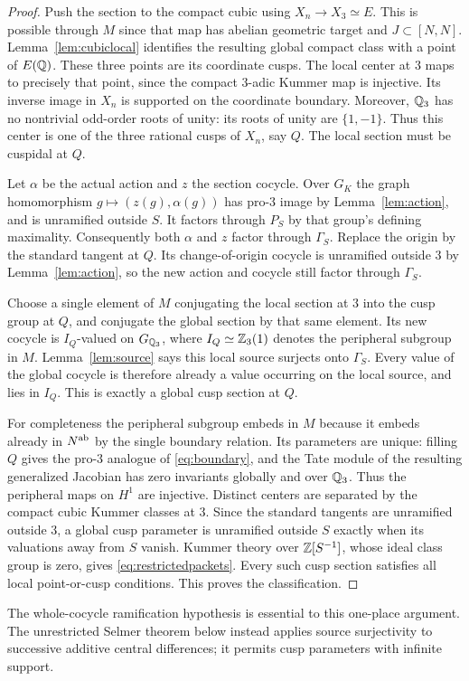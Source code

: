 \begin{proof}
Push the section to the compact cubic using $X_n\to X_3\simeq E$.
This is possible through $M$ since that map has abelian geometric
target and $J\subset[N,N]$. Lemma~\ref{lem:cubiclocal} identifies
the resulting global compact class with a point of $E(\mathbb Q)$.
These three points are its coordinate cusps. The local center at
$3$ maps to precisely that point, since the compact $3$-adic
Kummer map is injective. Its inverse image in $X_n$ is supported
on the coordinate boundary. Moreover, $\mathbb Q_3$ has no nontrivial
odd-order roots of unity: its roots of unity are $\{1,-1\}$.
Thus this center is one of the three rational cusps of $X_n$,
say $Q$. The local section must be cuspidal at $Q$.

Let $\alpha$ be the actual action and $z$ the section cocycle.
Over $G_K$ the graph homomorphism
$g\mapsto(z(g),\alpha(g))$ has pro-$3$ image by
Lemma~\ref{lem:action}, and is unramified outside $S$. It factors
through $P_S$ by that group's defining maximality. Consequently
both $\alpha$ and $z$ factor through $\Gamma_S$. Replace the
origin by the standard tangent at $Q$. Its change-of-origin
cocycle is unramified outside $3$ by Lemma~\ref{lem:action}, so
the new action and cocycle still factor through $\Gamma_S$.

Choose a single element of $M$ conjugating the local section at
$3$ into the cusp group at $Q$, and conjugate the global section
by that same element. Its new cocycle is $I_Q$-valued on
$G_{\mathbb Q_3}$, where $I_Q\simeq\mathbb Z_3(1)$ denotes the peripheral
subgroup in $M$. Lemma~\ref{lem:source} says this local source
surjects onto $\Gamma_S$. Every value of the global cocycle is
therefore already a value occurring on the local source, and
lies in $I_Q$. This is exactly a global cusp section at $Q$.

For completeness the peripheral subgroup embeds in $M$ because
it embeds already in $N^{\mathrm{ab}}$ by the single boundary relation.
Its parameters are unique: filling $Q$ gives the pro-$3$ analogue
of \eqref{eq:boundary}, and the Tate module of the resulting
generalized Jacobian has zero invariants globally and over
$\mathbb Q_3$. Thus the peripheral maps on $H^1$ are injective. Distinct
centers are separated by the compact cubic Kummer classes at $3$.
Since the standard tangents are unramified outside $3$, a global
cusp parameter is unramified outside $S$ exactly when its
valuations away from $S$ vanish. Kummer theory over
$\mathbb Z[S^{-1}]$, whose ideal class group is zero, gives
\eqref{eq:restrictedpackets}. Every such cusp section satisfies
all local point-or-cusp conditions. This proves the classification.
\end{proof}

The whole-cocycle ramification hypothesis is essential to this
one-place argument. The unrestricted Selmer theorem below instead
applies source surjectivity to successive additive central differences;
it permits cusp parameters with infinite support.
